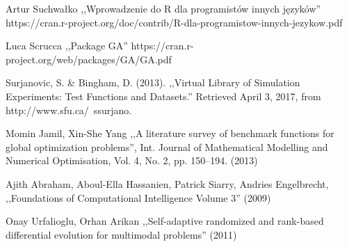 \documentclass[11pt, a4paper]{article}
\begin{document}
\newpage
\begin{thebibliography}{40}

Artur Suchwałko ,,Wprowadzenie do R dla programistów innych języków'' https://cran.r-project.org/doc/contrib/R-dla-programistow-innych-jezykow.pdf


Luca Scrucca ,,Package GA''
https://cran.r-project.org/web/packages/GA/GA.pdf

Surjanovic, S. \& Bingham, D. (2013). ,,Virtual Library of Simulation Experiments: Test Functions and Datasets.'' Retrieved April 3, 2017, from http://www.sfu.ca/~ssurjano.

Momin Jamil, Xin-She Yang ,,A literature survey of benchmark functions for global optimization problems'', Int. Journal of Mathematical Modelling and Numerical Optimisation, Vol. 4, No. 2, pp. 150–194. (2013)

Ajith Abraham, Aboul-Ella Hassanien, Patrick Siarry, Andries Engelbrecht, ,,Foundations of Computational Intelligence Volume 3'' (2009)

Onay Urfalioglu, Orhan Arikan ,,Self-adaptive randomized and rank-based differential evolution for multimodal problems'' (2011)

\end{thebibliography}
\end{document}
